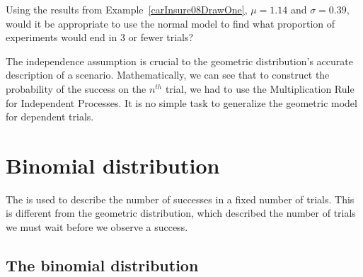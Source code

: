 \begin{exercisewrap}
\begin{nexercise}
Using the results from Example~\ref{carInsure08DrawOne},
$\mu = 1.14$ and $\sigma = 0.39$, would it be appropriate
to use the normal model to find what proportion
of experiments would end in 3 or fewer trials?\footnotemark{}
\end{nexercise}
\end{exercisewrap}

The independence assumption is crucial to the geometric
distribution's accurate description of a scenario.
Mathematically, we can see that to construct the probability
of the success on the $n^{th}$ trial, we had to use the
Multiplication Rule for Independent Processes.
It is no simple task to generalize the geometric model
for dependent trials.



{}





\section{Binomial distribution}
\label{binomialModel}


The 
is used to describe
the number of successes in a fixed number of trials.
This is different from the geometric distribution,
which described the number of trials we must wait before
we observe a success.


\subsection{The binomial distribution}

\newcommand{\insureS}{\resp{not}}
\newcommand{\insureF}{\resp{exceed}}
\newcommand{\insureBinomCinDSingleScenario}{0.103}
\newcommand{\insureBinomCinD}{0.412}
\newcommand{\insureBinomEinHSingleScenario}{0.00454}
\newcommand{\insureBinomEinH}{0.254}
\newcommand{\insureBinomFourtyExpValue}{28}
\newcommand{\insureBinomFourtySD}{2.9}
\newcommand{\insureBinomFourtyLower}{22}
\newcommand{\insureBinomFourtyUpper}{34}

